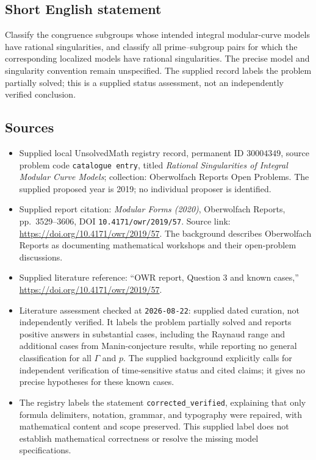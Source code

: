 \documentclass[11pt]{article}
\begin{document}
\subsection{Short English statement}
Classify the congruence subgroups whose intended integral modular-curve models have rational singularities, and classify all prime--subgroup pairs for which the corresponding localized models have rational singularities. The precise model and singularity convention remain unspecified. The supplied record labels the problem partially solved; this is a supplied status assessment, not an independently verified conclusion.
\subsection{Sources}
\begin{itemize}
\item Supplied local UnsolvedMath registry record, permanent ID \(30004349\), source problem code \texttt{catalogue entry}, titled \emph{Rational Singularities of Integral Modular Curve Models}; collection: Oberwolfach Reports Open Problems. The supplied proposed year is 2019; no individual proposer is identified.
\item Supplied report citation: \emph{Modular Forms (2020)}, Oberwolfach Reports, pp.~3529--3606, DOI \texttt{10.4171/owr/2019/57}. Source link: \url{https://doi.org/10.4171/owr/2019/57}. The background describes Oberwolfach Reports as documenting mathematical workshops and their open-problem discussions.
\item Supplied literature reference: ``OWR report, Question 3 and known cases,'' \url{https://doi.org/10.4171/owr/2019/57}.
\item Literature assessment checked at \texttt{2026-08-22}: supplied dated curation, not independently verified. It labels the problem partially solved and reports positive answers in substantial cases, including the Raynaud range and additional cases from Manin-conjecture results, while reporting no general classification for all \(\Gamma\) and \(p\). The supplied background explicitly calls for independent verification of time-sensitive status and cited claims; it gives no precise hypotheses for these known cases.
\item The registry labels the statement \texttt{corrected\_verified}, explaining that only formula delimiters, notation, grammar, and typography were repaired, with mathematical content and scope preserved. This supplied label does not establish mathematical correctness or resolve the missing model specifications.
\end{itemize}
\end{document}
